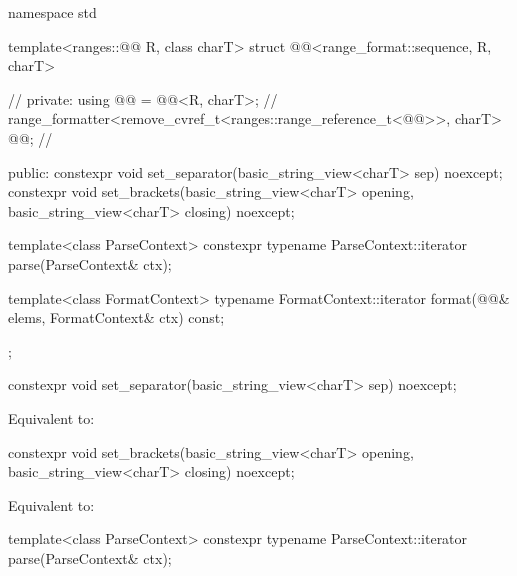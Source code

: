 %
\begin{codeblock}
namespace std {
  template<ranges::@@ R, class charT>
  struct @@<range_format::sequence, R, charT> {    // \expos
  private:
    using @@ = @@<R, charT>;                    // \expos
    range_formatter<remove_cvref_t<ranges::range_reference_t<@@>>,
                    charT> @@;                                 // \expos

  public:
    constexpr void set_separator(basic_string_view<charT> sep) noexcept;
    constexpr void set_brackets(basic_string_view<charT> opening,
                                basic_string_view<charT> closing) noexcept;

    template<class ParseContext>
      constexpr typename ParseContext::iterator
        parse(ParseContext& ctx);

    template<class FormatContext>
      typename FormatContext::iterator
        format(@@& elems, FormatContext& ctx) const;
  };
}
\end{codeblock}

%
\begin{itemdecl}
constexpr void set_separator(basic_string_view<charT> sep) noexcept;
\end{itemdecl}

\begin{itemdescr}
\pnum
\effects
Equivalent to: 
\end{itemdescr}

%
\begin{itemdecl}
constexpr void set_brackets(basic_string_view<charT> opening,
                            basic_string_view<charT> closing) noexcept;
\end{itemdecl}

\begin{itemdescr}
\pnum
\effects
Equivalent to: 
\end{itemdescr}

%
\begin{itemdecl}
template<class ParseContext>
  constexpr typename ParseContext::iterator
    parse(ParseContext& ctx);
\end{itemdecl}

